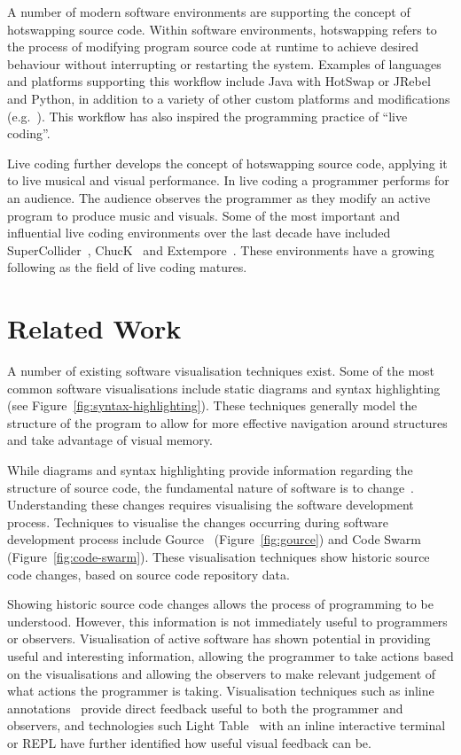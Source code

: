 A number of modern software environments are supporting the concept of hotswapping source code. Within software environments, hotswapping refers to the process of modifying program source code at runtime to achieve desired behaviour without interrupting or restarting the system. Examples of languages and platforms supporting this workflow include Java with HotSwap or JRebel~\cite{ZeroTurnaround2014} and Python, in addition to a variety of other custom platforms and modifications (e.g.~\cite{Thomas2011}). This workflow has also inspired the programming practice of ``live coding''. 

Live coding further develops the concept of hotswapping source code, applying it to live musical and visual performance. In live coding a programmer performs for an audience. The audience observes the programmer as they modify an active program to produce music and visuals. Some of the most important and influential live coding environments over the last decade have included SuperCollider~\cite{McCartney}, ChucK~\cite{Wang2008} and Extempore~\cite{Sorensen}. These environments have a growing following as the field of live coding matures.

\section{Related Work}

A number of existing software visualisation techniques exist. Some of the most common software visualisations include static diagrams and syntax highlighting (see Figure~\ref{fig:syntax-highlighting}). These techniques generally model the structure of the program to allow for more effective navigation around structures and take advantage of visual memory.

While diagrams and syntax highlighting provide information regarding the structure of source code, the fundamental nature of software is to change~\cite{Brooks1995}. Understanding these changes requires visualising the software development process. Techniques to visualise the changes occurring during software development process include Gource~\cite{Caudwell2010} (Figure~\ref{fig:gource}) and Code Swarm~\cite{Ogawa2012} (Figure~\ref{fig:code-swarm}). These visualisation techniques show historic source code changes, based on source code repository data.



Showing historic source code changes allows the process of programming to be understood. However, this information is not immediately useful to programmers or observers. Visualisation of active software has shown potential in providing useful and interesting information, allowing the programmer to take actions based on the visualisations and allowing the observers to make relevant judgement of what actions the programmer is taking. Visualisation techniques such as inline annotations~\cite{Swift2013,Beck2013} provide direct feedback useful to both the programmer and observers, and technologies such Light Table~\cite{Kodowa2014} with an inline interactive terminal or \ac{REPL} have further identified how useful visual feedback can be.

